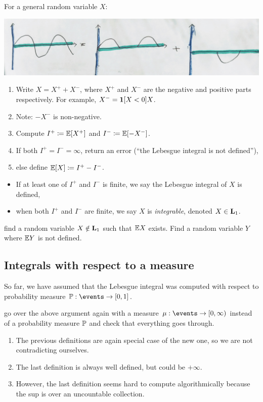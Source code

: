 \documentclass{article}
\begin{document}
For a general random variable $X$:
\begin{center}
	\includegraphics[width=0.8\linewidth]{figures/decomposition}
\end{center} 
\begin{enumerate}
  \item Write $X = X^{+} + X^{-}$, where $X^{+}$ and $X^{-}$ are the negative and positive parts respectively. For example, $X^{-} = \1[X < 0] X$. 
  \item Note: $-X^{-}$ is non-negative.
  \item Compute $I^{+} \defeq \E[X^+]$ and $I^{-} \defeq \E[-X^-]$.
  \item If both $I^{+} = I^- = \infty$, return an error (``the Lebesgue integral is not defined''),
  \item else define $\E[X] \defeq I^{+} - I^{-}$.
\end{enumerate}

\begin{itemize} 
  \item If at least one of $I^{+}$ and $I^-$ is finite, we say the Lebesgue integral of $X$ is defined,
  \item when both $I^{+}$ and $I^-$ are finite, we say $X$ is \emph{integrable}, denoted $X \in \L_1$. 
\end{itemize}

 find a random variable $X \notin \L_1$ such that $\E X$ exists. Find a random variable $Y$ where $\E Y$ is not defined. 


\subsection{Integrals with respect to a measure}

So far, we have assumed that the Lebesgue integral was computed with respect to probability measure $\P : \events \to [0, 1]$. 

 go over the above argument again with a measure $\mu : \events \to [0, \infty)$ instead of a probability measure $\P$ and check that everything goes through.

\begin{enumerate}
  \item The previous definitions are again special case of the new one, so we are not contradicting ourselves.
  \item The last definition is always well defined, but could be $+\infty$.
  \item However, the last definition seems hard to compute algorithmically because the sup is over an uncountable collection.
\end{enumerate}
\end{document}
